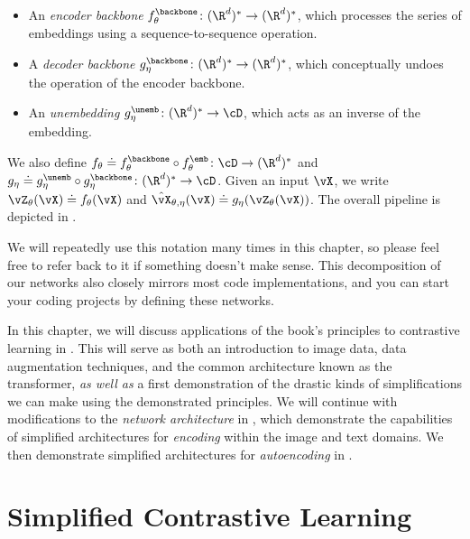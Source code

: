 \documentclass[../../book-main.tex]{subfiles}
\begin{document}
\begin{itemize}
\begin{itemize}
        \item An \textit{encoder backbone} \(f_{\theta}^{\backbone} \colon (\R^{d})^{*} \to (\R^{d})^{*}\), which processes the series of embeddings using a sequence-to-sequence operation.
        \item A \textit{decoder backbone} \(g_{\eta}^{\backbone} \colon (\R^{d})^{*} \to (\R^{d})^{*}\), which conceptually undoes the operation of the encoder backbone.
        \item An \textit{unembedding} \(g_{\eta}^{\unemb} \colon (\R^{d})^{*} \to \cD\), which acts as an inverse of the embedding.
    \end{itemize}
    We also define \(f_{\theta} \doteq f_{\theta}^{\backbone} \circ f_{\theta}^{\emb} \colon \cD \to (\R^{d})^{*}\) and \(g_{\eta} \doteq g_{\eta}^{\unemb} \circ g_{\eta}^{\backbone} \colon (\R^{d})^{*} \to \cD\). Given an input \(\vX\), we write \(\vZ_{\theta}(\vX) \doteq f_{\theta}(\vX)\) and \(\hat{\vX}_{\theta, \eta}(\vX) \doteq g_{\eta}(\vZ_{\theta}(\vX))\). The overall pipeline is depicted in .
\end{itemize}

We will repeatedly use this notation many times in this chapter, so please feel free to refer back to it if something doesn't make sense. This decomposition of our networks also closely mirrors most code implementations, and you can start your coding projects by defining these networks.

In this chapter, we will discuss applications of the book's principles to contrastive learning in . This will serve as both an introduction to image data, data augmentation techniques, and the common architecture known as the transformer, \textit{as well as} a first demonstration of the drastic kinds of simplifications we can make using the demonstrated principles. We will continue with modifications to the \textit{network architecture} in , which demonstrate the capabilities of simplified architectures for \textit{encoding} within the image and text domains. We then demonstrate simplified architectures for \textit{autoencoding} in . %


\section{Simplified Contrastive Learning}\label{sec:contrastive_learning}
\end{document}
